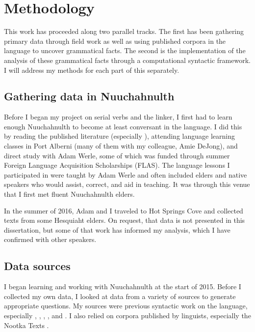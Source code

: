 \chapter{Methodology}
\label{sec:methodology}

This work has proceeded along two parallel tracks. The first has been gathering primary data through field work as well as using published corpora in the language to uncover grammatical facts. The second is the implementation of the analysis of these grammatical facts through a computational syntactic framework. I will address my methods for each part of this separately.

\section{Gathering data in Nuuchahnulth} \label{sec:method:ncn}

Before I began my project on serial verbs and the linker, I first had to learn enough Nuuchahnulth to become at least conversant in the language. I did this by reading the published literature (especially \citealt{sapir1939}), attending language learning classes in Port Alberni (many of them with my colleague, Amie DeJong), and direct study with Adam Werle, some of which was funded through summer Foreign Language Acquisition Scholarships (FLAS). The language lessons I participated in were taught by Adam Werle and often included elders and native speakers who would assist, correct, and aid in teaching. It was through this venue that I first met fluent Nuuchahnulth elders.

In the summer of 2016, Adam and I traveled to Hot Springs Cove and collected texts from some Hesquiaht elders. On request, that data is not presented in this dissertation, but some of that work has informed my analysis, which I have confirmed with other speakers.

\section{Data sources} \label{sec:method:sources}

I began learning and working with Nuuchahnulth at the start of 2015. Before I collected my own data, I looked at data from a variety of sources to generate appropriate questions. My sources were previous syntactic work on the language, especially \cite{jacobsen1993}, \cite{nakayama2001}, \cite{wojdak2003}, \cite{waldie2004}, and \cite{woo2007b}. I also relied on corpora published by linguists, especially the Nootka Texts \citep{sapir1924, sapir1939, sapir1955, whalingindians2000, whalingindians2004, whalingindians2009}.

